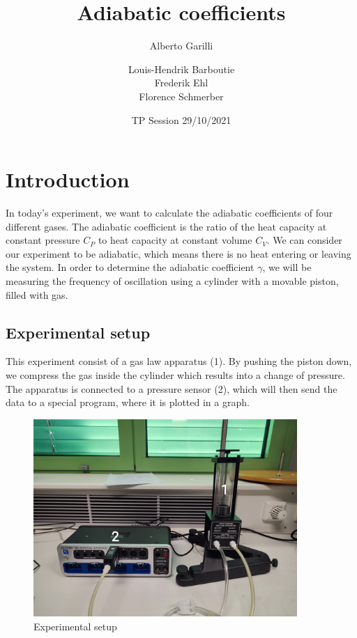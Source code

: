 \documentclass{scrartcl}
\title{Adiabatic coefficients}
\subtitle{Alberto Garilli}
\date{TP Session 29/10/2021}
\author{Louis-Hendrik Barboutie \\ Frederik Ehl \\ Florence Schmerber}
\begin{document}
\maketitle

\clearpage

\tableofcontents
\listoffigures
	
\clearpage

\section{Introduction}
In today's experiment, we want to calculate the adiabatic coefficients of four different gases. The adiabatic coefficient is the ratio of the heat capacity at constant pressure $C_P$ to heat capacity at constant volume $C_V$. We can consider our experiment to be adiabatic, which means there is no heat entering or leaving the system.
In order to determine the adiabatic coefficient $\gamma$, we will be measuring the frequency of oscillation using a cylinder with a movable piston, filled with gas.

\subsection{Experimental setup}
This experiment consist of a gas law apparatus (1). By pushing the piston down, we compress the gas inside the cylinder which results into a change of pressure. The apparatus is connected to a pressure sensor (2), which will then send the data to a special program, where it is plotted in a graph.
\begin{figure}[h]
    \centering
    \includegraphics[width=10cm]{IMG_20211101_103850.jpg}
    \caption{Experimental setup}
    \label{fig:my_label}
\end{figure}
\end{document}
